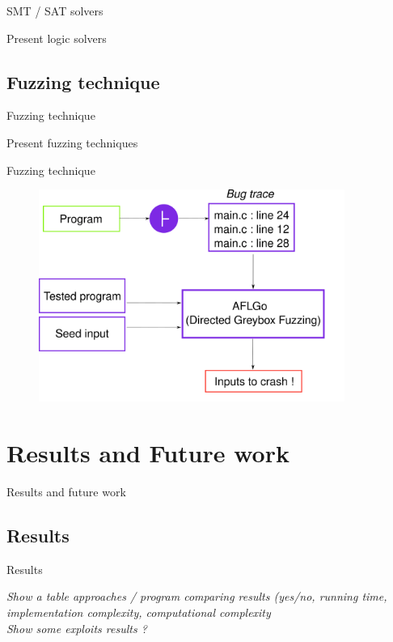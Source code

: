\documentclass{beamer}
\begin{document}
\begin{frame}{SMT / SAT solvers}

Present logic solvers

\end{frame}



\subsection{Fuzzing technique}

\begin{frame}{Fuzzing technique}

Present fuzzing techniques

\end{frame}

\begin{frame}{Fuzzing technique}

\begin{figure}
\includegraphics[width=10cm]{Figures/Fuzzing.png}
\end{figure}

\end{frame}


\section{Results and Future work}

\begin{frame}
\centering

Results and future work
\end{frame}

\subsection{Results}

\begin{frame}{Results}

\textit{Show a table approaches / program comparing results (yes/no, running time, implementation complexity, computational complexity } \\
\textit{Show some exploits results ?}

\end{frame}
\end{document}
